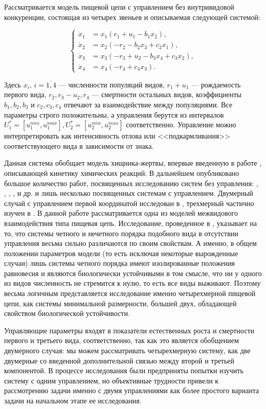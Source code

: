 \documentclass[11pt]{article}
\theoremstyle{definition}
\newcommand\ftw[2]{\overline{#1,#2}}
\newcommand\beq{\begin{equation}}
\newcommand\eeq{\end{equation}}
\begin{document}
Рассматривается модель пищевой цепи с управлением без внутривидовой конкуренции, состоящая из четырех звеньев и описываемая следующей системой:

\beq
\left\{
\begin{aligned}
\label{system}
	\dot x_1 &= x_1(r_1 + u_1- b_1x_2), \\
	\dot x_2 &= x_2(-r_2 - b_2x_3 + c_2x_1), \\
	\dot x_3 &= x_3(-r_3 + u_2 - b_3x_4 + c_3x_2), \\
	\dot x_4 &= x_4(-r_4 + c_4x_3).
\end{aligned}
\right.
\eeq

Здесь $x_i,\, i = \ftw{1}{4}$ --- численности популяций видов, $r_1 + u_1$ --- рождаемость первого вида,  $r_2, r_3-u_2, r_4$ --- смертности остальных видов, коэффициенты $b_1, b_2, b_3$ и $c_2, c_3, c_4$ отвечают за взаимодействие между популяциями. Все параметры строго положительны, а управления берутся из интервалов $U_1^* = [u_1^{min}, u_1^{max}], U_2^* = [u_2^{min}, u_2^{max}]$ соответственно. Управление можно интерпретировать как интенсивность отлова или <<подкармливания>> соответствующего вида в зависимости от знака.

Данная система обобщает модель хищника-жертвы, впервые введенную в работе \cite{Lotka}, описывающей кинетику химических реакций. В дальнейшем опубликовано большое количество работ, посвященных исследованию систем без управления: \cite{Murray}, \cite{Basykin}, \cite{three_spec}, \cite{darboux}, \cite{Bratus} и др. и лишь несколько посвященных системам с управлением. Двумерный случай с управлением первой координатой исследован в \cite{Ruble}, трехмерный частично изучен в \cite{Aushkap}. В данной работе рассматривается одна из моделей межвидового взаимодействия типа пищевая цепь. Исследование, проведенное в \cite{MathBio}, указывает на то, что системы четного и нечетного порядка подобного вида в отсутствии управления весьма сильно различаются по своим свойствам. А именно, в общем положении параметров модели (то есть исключая некоторые вырожденные случаи) лишь системы четного порядка имеют изолированные положения равновесия и являются биологически устойчивыми в том смысле, что ни у одного из видов численность не стремится к нулю, то есть все виды выживают. Поэтому весьма логичным представляется исследование именно четырехмерной пищевой цепи, как системы минимальной размерности, большей двух, обладающей свойством биологической устойчивости.

Управляющие параметры входят в показатели естественных роста и смертности первого и третьего вида, соответственно, так как это является обобщением двумерного случая: мы можем рассматривать четырехмерную систему, как две двумерные со введенной дополнительной связью между второй и третьей компонентой. В процессе исследования были предприняты попытки изучить систему с одним управлением, но объективные трудности привели к рассмотрению задачи именно с двумя управлениями как более простого варианта задачи на начальном этапе ее исследования.
\end{document}
